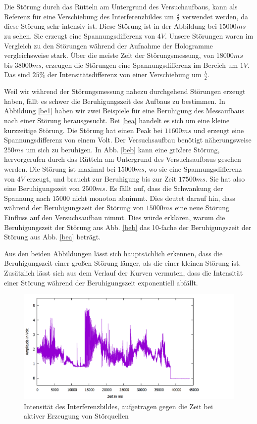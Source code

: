 \documentclass[10pt,a4paper]{article}
\begin{document}
Die Störung durch das Rütteln am Untergrund des Versuchaufbaus, kann als Referenz für eine Verschiebung des Interferenzbildes um $\frac{\lambda}{2}$ verwendet werden, da diese Störung sehr intensiv ist. Diese Störung ist in der Abbildung bei $15000ms$ zu sehen. Sie erzeugt eine Spannungsdifferenz von $4V$. Unsere Störungen waren im Vergleich zu den Störungen während der Aufnahme der Hologramme vergleichsweise stark. Über die meiste Zeit der Störungsmessung, von $18000ms$ bis $38000ms$, erzeugen die Störungen eine Spannungsdifferenz im Bereich um $1V$. Das sind $25\%$ der Intensitätsdifferenz von einer Verschiebung um $\frac{\lambda}{2}$. 

Weil wir während der Störungsmessung nahezu durchgehend Störungen erzeugt haben, fällt es schwer die Beruhigungszeit des Aufbaus zu bestimmen. In Abbildung \ref{be1} haben wir zwei Beispiele für eine Beruhigung des Messaufbaus nach einer Störung herausgesucht. Bei \ref{bea} handelt es sich um eine kleine kurzzeitige Störung. Die Störung hat einen Peak bei $11600ms$ und erzeugt eine Spannungsdifferenz von einem Volt. Der Versuchsaufbau benötigt näherungsweise $250ms$ um sich zu beruhigen. In Abb. \ref{beb} kann eine größere Störung, hervorgerufen durch das Rütteln am Untergrund des Versuchsaufbaus gesehen werden. Die Störung ist maximal bei $15000ms$, wo sie eine Spannungsdifferenz von $4V$ erzeugt, und braucht zur Beruhigung bis zur Zeit $17500ms$. Sie hat also eine Beruhigungszeit von $2500ms$. Es fällt auf, dass die Schwankung der Spannung nach $15000$ nicht monoton abnimmt. Dies deutet darauf hin, dass während der Beruhigungszeit der Störung von $15000ms$ eine neue Störung Einfluss auf den Versuchsaufbau nimmt. Dies würde erklären, warum die Beruhigungszeit der Störung aus Abb. \ref{beb} das 10-fache der Beruhigungszeit der Störung aus Abb. \ref{bea} beträgt. 

Aus den beiden Abbildungen lässt sich hauptsächlich erkennen, dass die Beruhigungszeit einer großen Störung länger, als die einer kleinen Störung ist. Zusätzlich lässt sich aus dem Verlauf der Kurven vermuten, dass die Intensität einer Störung während der Beruhigungszeit exponentiell abfällt.

	\begin{figure}[h]
		\centering
		\includegraphics[scale = 0.26]{storung.png}
		\caption{Intensität des Interferenzbildes, aufgetragen gegen die Zeit bei aktiver Erzeugung von Störquellen}
		\label{stor1}
	\end{figure}
	
\end{document}
